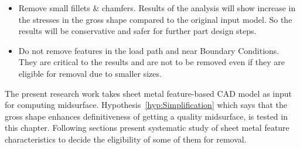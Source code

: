 \begin{itemize}[noitemsep,topsep=2pt,parsep=2pt,partopsep=2pt]
\item Remove small fillets \& chamfers. Results of the analysis will show increase in the stresses in the gross shape compared to the original input model. So the results will be conservative and safer for further part design steps.
\item Do not remove features in the load path and near Boundary Conditions. They are critical to the results and are not to be removed even if they are eligible for removal due to smaller sizes.
\end{itemize}

The present research work takes sheet metal feature-based CAD model as input for computing midsurface. Hypothesis~\ref{hyp:Simplification} which says that the gross shape enhances definitiveness of getting a quality midsurface, is tested in this chapter. Following sections present systematic study of sheet metal feature characteristics to decide the eligibility of some of them for removal.
	
